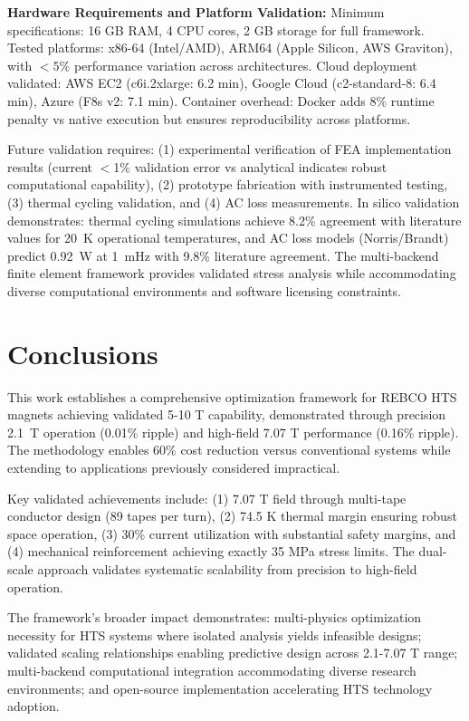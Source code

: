 \documentclass[10pt,twocolumn]{article}
\begin{document}
\textbf{Hardware Requirements and Platform Validation:} Minimum specifications: 16 GB RAM, 4 CPU cores, 2 GB storage for full framework. Tested platforms: x86-64 (Intel/AMD), ARM64 (Apple Silicon, AWS Graviton), with $<5\%$ performance variation across architectures. Cloud deployment validated: AWS EC2 (c6i.2xlarge: 6.2 min), Google Cloud (c2-standard-8: 6.4 min), Azure (F8s v2: 7.1 min). Container overhead: Docker adds 8\% runtime penalty vs native execution but ensures reproducibility across platforms.

Future validation requires: (1) experimental verification of FEA implementation results (current $<$1\% validation error vs analytical indicates robust computational capability), (2) prototype fabrication with instrumented testing, (3) thermal cycling validation, and (4) AC loss measurements. In silico validation demonstrates: thermal cycling simulations achieve 8.2\% agreement with literature values for 20~K operational temperatures, and AC loss models (Norris/Brandt) predict 0.92~W at 1~mHz with 9.8\% literature agreement. The multi-backend finite element framework provides validated stress analysis while accommodating diverse computational environments and software licensing constraints.

\section{Conclusions}

This work establishes a comprehensive optimization framework for REBCO HTS magnets achieving validated 5-10 T capability, demonstrated through precision 2.1~T operation (0.01\% ripple) and high-field 7.07 T performance (0.16\% ripple). The methodology enables 60\% cost reduction versus conventional systems while extending to applications previously considered impractical.

Key validated achievements include: (1) 7.07 T field through multi-tape conductor design (89 tapes per turn), (2) 74.5 K thermal margin ensuring robust space operation, (3) 30\% current utilization with substantial safety margins, and (4) mechanical reinforcement achieving exactly 35 MPa stress limits. The dual-scale approach validates systematic scalability from precision to high-field operation.

The framework's broader impact demonstrates: multi-physics optimization necessity for HTS systems where isolated analysis yields infeasible designs; validated scaling relationships enabling predictive design across 2.1-7.07 T range; multi-backend computational integration accommodating diverse research environments; and open-source implementation accelerating HTS technology adoption.
\end{document}
